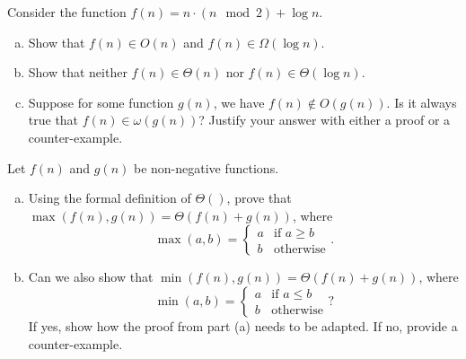 \documentclass[11pt]{article}
\begin{document}



    \newpage
    \begin{tcolorbox}[title={Problem 2 (30 pts)}]
    Consider the function $f(n)= n\cdot ( n \mod 2) + \log n$.
    
    \begin{enumerate}[(a)]
        \item Show that $f(n) \in O(n)$ and $f(n) \in \Omega(\log n)$.
        \item Show that neither $f(n) \in \Theta(n)$ nor $f(n) \in \Theta(\log n)$.
        \item Suppose for some function $g(n)$, we have $f(n) \not \in O(g(n))$. Is it always true that $f(n)\in \omega(g(n))$? Justify your answer with either a proof or a counter-example.
    \end{enumerate}
    \end{tcolorbox}
    
    

    \newpage
    \begin{tcolorbox}[title={Problem 3 (20 pts)}]
    Let $f(n)$ and $g(n)$ be non-negative functions. \begin{enumerate}[(a)]
        \item Using the formal definition of $\Theta()$, prove that $\max(f(n),g(n))=\Theta(f(n)+g(n))$, where \[\max(a, b)=\begin{cases}
        a &\text{if } a\geq b\\
        b &\text{otherwise}
    \end{cases}.\]
        \item Can we also show that $\min(f(n),g(n))=\Theta(f(n)+g(n))$, where \[\min(a, b)=\begin{cases}
        a &\text{if } a\leq b\\
        b &\text{otherwise}
    \end{cases}?\] If yes, show how the proof from part (a) needs to be adapted. If no, provide a counter-example.
    \end{enumerate}
    
    \end{tcolorbox}
    
\end{document}
